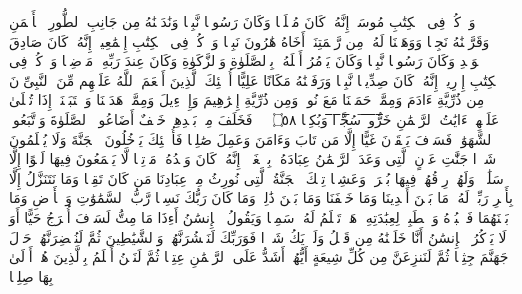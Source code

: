 \startbuffer[\q:19:51]
وَٱذۡكُرۡ فِی ٱلۡكِتَٰبِ مُوسَىٰۤۚ إِنَّهُۥ كَانَ مُخۡلَصࣰا وَكَانَ رَسُولࣰا نَّبِیࣰّا%
\stopbuffer
\startbuffer[\q:19:52]
وَنَٰدَیۡنَٰهُ مِن جَانِبِ ٱلطُّورِ ٱلۡأَیۡمَنِ وَقَرَّبۡنَٰهُ نَجِیࣰّا%
\stopbuffer
\startbuffer[\q:19:53]
وَوَهَبۡنَا لَهُۥ مِن رَّحۡمَتِنَاۤ أَخَاهُ هَٰرُونَ نَبِیࣰّا%
\stopbuffer
\startbuffer[\q:19:54]
وَٱذۡكُرۡ فِی ٱلۡكِتَٰبِ إِسۡمَٰعِیلَۚ إِنَّهُۥ كَانَ صَادِقَ ٱلۡوَعۡدِ وَكَانَ رَسُولࣰا نَّبِیࣰّا%
\stopbuffer
\startbuffer[\q:19:55]
وَكَانَ یَأۡمُرُ أَهۡلَهُۥ بِٱلصَّلَوٰةِ وَٱلزَّكَوٰةِ وَكَانَ عِندَ رَبِّهِۦ مَرۡضِیࣰّا%
\stopbuffer
\startbuffer[\q:19:56]
وَٱذۡكُرۡ فِی ٱلۡكِتَٰبِ إِدۡرِیسَۚ إِنَّهُۥ كَانَ صِدِّیقࣰا نَّبِیࣰّا%
\stopbuffer
\startbuffer[\q:19:57]
وَرَفَعۡنَٰهُ مَكَانًا عَلِیًّا%
\stopbuffer
\startbuffer[\q:19:58]
أُو۟لَٰۤئِكَ ٱلَّذِینَ أَنۡعَمَ ٱللَّهُ عَلَیۡهِم مِّنَ ٱلنَّبِیِّۦنَ مِن ذُرِّیَّةِ ءَادَمَ وَمِمَّنۡ حَمَلۡنَا مَعَ نُوحࣲ وَمِن ذُرِّیَّةِ إِبۡرَٰهِیمَ وَإِسۡرَٰۤءِیلَ وَمِمَّنۡ هَدَیۡنَا وَٱجۡتَبَیۡنَاۤۚ إِذَا تُتۡلَىٰ عَلَیۡهِمۡ ءَایَٰتُ ٱلرَّحۡمَٰنِ خَ̅رُّ̅و̅ا۟̅ ̅سُ̅جَّ̅دࣰ̅ا̅ وَبُكِیࣰّا ۝٥٨ ۩%
\stopbuffer
\startbuffer[\q:19:59]
۞ فَخَلَفَ مِنۢ بَعۡدِهِمۡ خَلۡفٌ أَضَاعُوا۟ ٱلصَّلَوٰةَ وَٱتَّبَعُوا۟ ٱلشَّهَوَٰتِۖ فَسَوۡفَ یَلۡقَوۡنَ غَیًّا%
\stopbuffer
\startbuffer[\q:19:60]
إِلَّا مَن تَابَ وَءَامَنَ وَعَمِلَ صَٰلِحࣰا فَأُو۟لَٰۤئِكَ یَدۡخُلُونَ ٱلۡجَنَّةَ وَلَا یُظۡلَمُونَ شَیۡءࣰا%
\stopbuffer
\startbuffer[\q:19:61]
جَنَّٰتِ عَدۡنٍ ٱلَّتِی وَعَدَ ٱلرَّحۡمَٰنُ عِبَادَهُۥ بِٱلۡغَیۡبِۚ إِنَّهُۥ كَانَ وَعۡدُهُۥ مَأۡتِیࣰّا%
\stopbuffer
\startbuffer[\q:19:62]
لَّا یَسۡمَعُونَ فِیهَا لَغۡوًا إِلَّا سَلَٰمࣰاۖ وَلَهُمۡ رِزۡقُهُمۡ فِیهَا بُكۡرَةࣰ وَعَشِیࣰّا%
\stopbuffer
\startbuffer[\q:19:63]
تِلۡكَ ٱلۡجَنَّةُ ٱلَّتِی نُورِثُ مِنۡ عِبَادِنَا مَن كَانَ تَقِیࣰّا%
\stopbuffer
\startbuffer[\q:19:64]
وَمَا نَتَنَزَّلُ إِلَّا بِأَمۡرِ رَبِّكَۖ لَهُۥ مَا بَیۡنَ أَیۡدِینَا وَمَا خَلۡفَنَا وَمَا بَیۡنَ ذَٰلِكَۚ وَمَا كَانَ رَبُّكَ نَسِیࣰّا%
\stopbuffer
\startbuffer[\q:19:65]
رَّبُّ ٱلسَّمَٰوَٰتِ وَٱلۡأَرۡضِ وَمَا بَیۡنَهُمَا فَٱعۡبُدۡهُ وَٱصۡطَبِرۡ لِعِبَٰدَتِهِۦۚ هَلۡ تَعۡلَمُ لَهُۥ سَمِیࣰّا%
\stopbuffer
\startbuffer[\q:19:66]
وَیَقُولُ ٱلۡإِنسَٰنُ أَءِذَا مَا مِتُّ لَسَوۡفَ أُخۡرَجُ حَیًّا%
\stopbuffer
\startbuffer[\q:19:67]
أَوَ لَا یَذۡكُرُ ٱلۡإِنسَٰنُ أَنَّا خَلَقۡنَٰهُ مِن قَبۡلُ وَلَمۡ یَكُ شَیۡءࣰا%
\stopbuffer
\startbuffer[\q:19:68]
فَوَرَبِّكَ لَنَحۡشُرَنَّهُمۡ وَٱلشَّیَٰطِینَ ثُمَّ لَنُحۡضِرَنَّهُمۡ حَوۡلَ جَهَنَّمَ جِثِیࣰّا%
\stopbuffer
\startbuffer[\q:19:69]
ثُمَّ لَنَنزِعَنَّ مِن كُلِّ شِیعَةٍ أَیُّهُمۡ أَشَدُّ عَلَى ٱلرَّحۡمَٰنِ عِتِیࣰّا%
\stopbuffer
\startbuffer[\q:19:70]
ثُمَّ لَنَحۡنُ أَعۡلَمُ بِٱلَّذِینَ هُمۡ أَوۡلَىٰ بِهَا صِلِیࣰّا%
